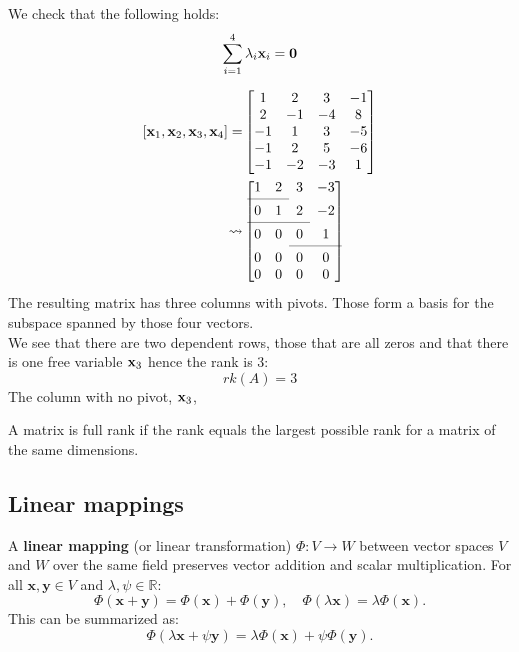 We check that the following holds:
\[
  \sum_{i=1}^4 \lambda_i \vb x_i = \vb 0
\]

\begin{align*}
  \left[ \vb x_1, \vb x_2, \vb x_3, \vb x_4\right] =&
  \begin{bmatrix}
    1 & 2 & 3 & -1\\
    2 & -1 & -4 & 8\\
    -1 & 1 & 3 & -5\\
    -1 & 2 & 5 & -6\\
    -1 & -2 & -3 & 1
  \end{bmatrix}\\
  \rightsquigarrow&
  \begin{bmatrix}
    1 & 2 & 3 & -3\\
    \cmidrule{0-1}
    0 & 1 & 2 & -2\\
    \cmidrule{1-3}
    0 & 0 & 0 & 1\\
    \cmidrule{3-4}
    0 & 0 & 0 & 0\\
    0 & 0 & 0 & 0
  \end{bmatrix}
\end{align*}
The resulting matrix has three columns with pivots. Those form a basis for the subspace spanned by those four vectors.\\
We see that there are two dependent rows, those that are all zeros and that there is one free variable $\vb x_3$ hence the rank is 3:
\[
  rk(A) = 3
\]
The column with no pivot, $\vb x_3$, 

A matrix is full rank if the rank equals the largest possible rank for a matrix of the same dimensions.

\subsection{Linear mappings}
A \textbf{linear mapping} (or linear transformation) \(\Phi: V \to W\) between vector spaces \(V\) and \(W\) over the same field preserves vector addition and scalar multiplication. For all \(\mathbf{x}, \mathbf{y} \in V\) and \(\lambda, \psi \in \mathbb{R}\):
\[
\Phi(\mathbf{x} + \mathbf{y}) = \Phi(\mathbf{x}) + \Phi(\mathbf{y}), \quad \Phi(\lambda \mathbf{x}) = \lambda \Phi(\mathbf{x}).
\]
This can be summarized as:
\[
\Phi(\lambda \mathbf{x} + \psi \mathbf{y}) = \lambda \Phi(\mathbf{x}) + \psi \Phi(\mathbf{y}).
\]

